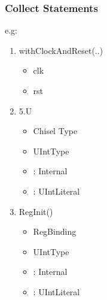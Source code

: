 \begin{frame}
  \frametitle{Collect Statements}

  e.g: \hbox{}

  \begin{enumerate}
    \item withClockAndReset(..)
      \begin{itemize}
        \item {} clk
        \item {} rst
      \end{itemize}
    \item 5.U \rightarrow {}
      \begin{itemize}
        \item {} Chisel Type
        \item {} UIntType
        \item {}: Internal
        \item {}: UIntLiteral
      \end{itemize}
    \item RegInit() \rightarrow {} \rightarrow {}
      \begin{itemize}
        \item {} RegBinding
        \item {} UIntType
        \item {}: Internal
        \item {}: UIntLiteral
      \end{itemize}
    \end{enumerate}
\end{frame}

